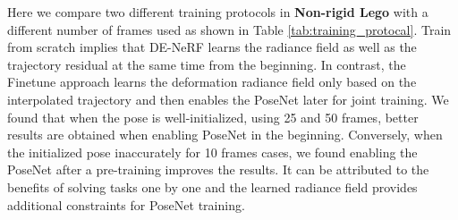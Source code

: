 \documentclass[10pt,twocolumn,letterpaper]{article}
\begin{document}
Here we compare two different training protocols in \textbf{Non-rigid Lego} with a different number of frames used as shown in Table \ref{tab:training_protocal}. Train from scratch implies that DE-NeRF learns the radiance field as well as the trajectory residual at the same time from the beginning. In contrast, the Finetune approach learns the deformation radiance field only based on the interpolated trajectory and then enables the PoseNet later for joint training. We found that when the pose is well-initialized, using 25 and 50 frames, better results are obtained when enabling PoseNet in the beginning. Conversely, when the initialized pose inaccurately for 10 frames cases, we found enabling the PoseNet after a pre-training improves the results. It can be attributed to the benefits of solving tasks one by one and the learned radiance field provides additional constraints for PoseNet training.

\begin{table}[h]
\begin{center}
\vspace{1mm}
\caption{\textbf{Influence of $\lambda$.} PSNR values for different hyperparameter $\lambda$ of the RGB photometric loss on Lego dataset.
}
\label{tab:lambda_compare}
\end{center}
\end{table}

\begin{table}[!htbp]
\begin{center}
\vspace{1mm}
\caption{\textbf{Different warps.} Two cases highlighting the pros and cons of SE(3) deformation field compared to translation only.
}
\label{tab:rotation_compare}
\end{center}
\end{table}
\end{document}
